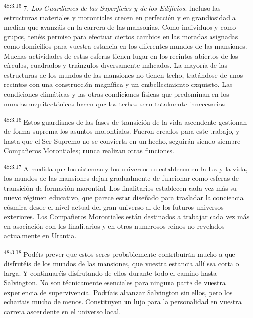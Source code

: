 \par
\textsuperscript{48:3.15} 7. \textit{Los Guardianes de las Superficies y de los Edificios}. Incluso las estructuras materiales y morontiales crecen en perfección y en grandiosidad a medida que avanzáis en la carrera de las mansonias. Como individuos y como grupos, tenéis permiso para efectuar ciertos cambios en las moradas asignadas como domicilios para vuestra estancia en los diferentes mundos de las mansiones. Muchas actividades de estas esferas tienen lugar en los recintos abiertos de los círculos, cuadrados y triángulos diversamente indicados. La mayoría de las estructuras de los mundos de las mansiones no tienen techo, tratándose de unos recintos con una construcción magnífica y un embellecimiento exquisito. Las condiciones climáticas y las otras condiciones físicas que predominan en los mundos arquitectónicos hacen que los techos sean totalmente innecesarios.

\par
\textsuperscript{48:3.16} Estos guardianes de las fases de transición de la vida ascendente gestionan de forma suprema los asuntos morontiales. Fueron creados para este trabajo, y hasta que el Ser Supremo no se convierta en un hecho, seguirán siendo siempre Compañeros Morontiales; nunca realizan otras funciones.

\par
\textsuperscript{48:3.17} A medida que los sistemas y los universos se establecen en la luz y la vida, los mundos de las mansiones dejan gradualmente de funcionar como esferas de transición de formación morontial. Los finalitarios establecen cada vez más su nuevo régimen educativo, que parece estar diseñado para trasladar la conciencia cósmica desde el nivel actual del gran universo al de los futuros universos exteriores. Los Compañeros Morontiales están destinados a trabajar cada vez más en asociación con los finalitarios y en otros numerosos reinos no revelados actualmente en Urantia.

\par
\textsuperscript{48:3.18} Podéis prever que estos seres probablemente contribuirán mucho a que disfrutéis de los mundos de las mansiones, que vuestra estancia allí sea corta o larga. Y continuaréis disfrutando de ellos durante todo el camino hasta Salvington. No son técnicamente esenciales para ninguna parte de vuestra experiencia de supervivencia. Podríais alcanzar Salvington sin ellos, pero los echaríais mucho de menos. Constituyen un lujo para la personalidad en vuestra carrera ascendente en el universo local.

